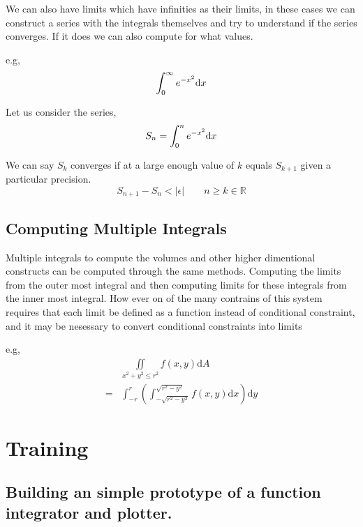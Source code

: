 \documentclass[12pt]{article}
\begin{document}
We can also have limits which have infinities as their limits, in these cases we can construct a series with
the integrals themselves and try to understand if the series converges. If it does we can also compute for what
values.

e.g,
\begin{equation*}
	\int_{0}^\infty e^{-x^2} \mathrm{d}x\\
\end{equation*}

Let us consider the series,
\begin{equation*}
	S_n = \int_{0}^n e^{-x^2} \mathrm{d}x\\
\end{equation*}

We can say $S_k$ converges if at a large enough value of $k$ equals $S_{k+1}$ given a particular precision.
\begin{equation*}
	S_{n+1} - S_{n} < \vert \epsilon \vert \quad \quad n \ge k \in \mathbb{R}
\end{equation*}

\subsection*{Computing Multiple Integrals}

Multiple integrals to compute the volumes and other higher dimentional constructs can be computed through the same methods.
Computing the limits from the outer most integral and then computing limits for these integrals from the inner most integral.
How ever on of the many contrains of this system requires that each limit be defined as a function instead of conditional constraint,
and it may be nesessary to convert conditional constraints into limits

e.g,
\begin{align*}
	&\iint \limits_{x^2 + y^2 \le r^2} f(x, y) \mathrm{d}A\\
	= &\int_{-r}^{r} \left( \int_{-\sqrt{r^2 - y^2}}^{\sqrt{r^2 - y^2}} f(x, y)\mathrm{d}x \right) \mathrm{d}y
\end{align*}

\section*{Training}

\subsection*{Building an simple prototype of a function integrator and plotter.}
\end{document}
